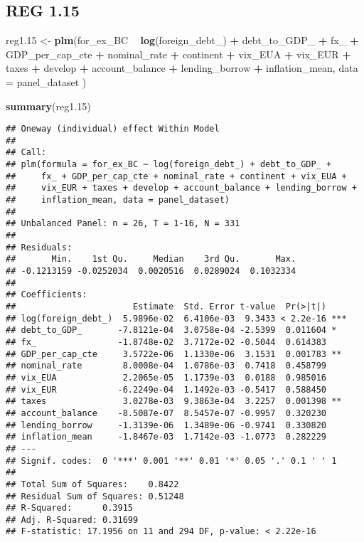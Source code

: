 \documentclass[]{article}
\newenvironment{Shaded}{\begin{snugshade}}{\end{snugshade}}
\newcommand{\KeywordTok}[1]{\textcolor[rgb]{0.13,0.29,0.53}{\textbf{#1}}}
\newcommand{\DataTypeTok}[1]{\textcolor[rgb]{0.13,0.29,0.53}{#1}}
\newcommand{\DecValTok}[1]{\textcolor[rgb]{0.00,0.00,0.81}{#1}}
\newcommand{\StringTok}[1]{\textcolor[rgb]{0.31,0.60,0.02}{#1}}
\newcommand{\OperatorTok}[1]{\textcolor[rgb]{0.81,0.36,0.00}{\textbf{#1}}}
\newcommand{\NormalTok}[1]{#1}
\begin{document}
\subsection{REG 1.15}\label{reg-1.15}

\begin{Shaded}
\begin{Highlighting}[]
\NormalTok{reg1.}\DecValTok{15}\NormalTok{ <-}\StringTok{ }\KeywordTok{plm}\NormalTok{(for_ex_BC }\OperatorTok{~}\StringTok{ }\KeywordTok{log}\NormalTok{(foreign_debt_) }\OperatorTok{+}\StringTok{ }\NormalTok{debt_to_GDP_ }\OperatorTok{+}\StringTok{ }\NormalTok{fx_ }\OperatorTok{+}\StringTok{ }\NormalTok{GDP_per_cap_cte }\OperatorTok{+}\StringTok{ }\NormalTok{nominal_rate }\OperatorTok{+}\StringTok{ }\NormalTok{continent }\OperatorTok{+}\StringTok{ }\NormalTok{vix_EUA }\OperatorTok{+}\StringTok{ }\NormalTok{vix_EUR }\OperatorTok{+}\StringTok{ }\NormalTok{taxes }\OperatorTok{+}\StringTok{ }\NormalTok{develop }\OperatorTok{+}\StringTok{ }\NormalTok{account_balance }\OperatorTok{+}\StringTok{ }\NormalTok{lending_borrow }\OperatorTok{+}\StringTok{ }\NormalTok{inflation_mean, }\DataTypeTok{data =}\NormalTok{ panel_dataset )}

\KeywordTok{summary}\NormalTok{(reg1.}\DecValTok{15}\NormalTok{)}
\end{Highlighting}
\end{Shaded}

\begin{verbatim}
## Oneway (individual) effect Within Model
## 
## Call:
## plm(formula = for_ex_BC ~ log(foreign_debt_) + debt_to_GDP_ + 
##     fx_ + GDP_per_cap_cte + nominal_rate + continent + vix_EUA + 
##     vix_EUR + taxes + develop + account_balance + lending_borrow + 
##     inflation_mean, data = panel_dataset)
## 
## Unbalanced Panel: n = 26, T = 1-16, N = 331
## 
## Residuals:
##       Min.    1st Qu.     Median    3rd Qu.       Max. 
## -0.1213159 -0.0252034  0.0020516  0.0289024  0.1032334 
## 
## Coefficients:
##                       Estimate  Std. Error t-value  Pr(>|t|)    
## log(foreign_debt_)  5.9896e-02  6.4106e-03  9.3433 < 2.2e-16 ***
## debt_to_GDP_       -7.8121e-04  3.0758e-04 -2.5399  0.011604 *  
## fx_                -1.8748e-02  3.7172e-02 -0.5044  0.614383    
## GDP_per_cap_cte     3.5722e-06  1.1330e-06  3.1531  0.001783 ** 
## nominal_rate        8.0008e-04  1.0786e-03  0.7418  0.458799    
## vix_EUA             2.2065e-05  1.1739e-03  0.0188  0.985016    
## vix_EUR            -6.2249e-04  1.1492e-03 -0.5417  0.588450    
## taxes               3.0278e-03  9.3863e-04  3.2257  0.001398 ** 
## account_balance    -8.5087e-07  8.5457e-07 -0.9957  0.320230    
## lending_borrow     -1.3139e-06  1.3489e-06 -0.9741  0.330820    
## inflation_mean     -1.8467e-03  1.7142e-03 -1.0773  0.282229    
## ---
## Signif. codes:  0 '***' 0.001 '**' 0.01 '*' 0.05 '.' 0.1 ' ' 1
## 
## Total Sum of Squares:    0.8422
## Residual Sum of Squares: 0.51248
## R-Squared:      0.3915
## Adj. R-Squared: 0.31699
## F-statistic: 17.1956 on 11 and 294 DF, p-value: < 2.22e-16
\end{verbatim}
\end{document}
